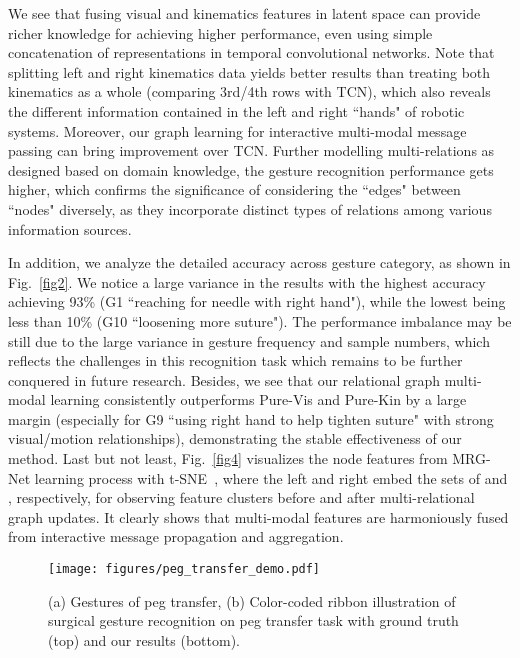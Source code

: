 \documentclass[letterpaper, 10 pt, conference]{ieeeconf}
\begin{document}
We see that fusing visual and kinematics features in latent space can provide richer knowledge for achieving higher performance, even using simple concatenation of representations in temporal convolutional networks.
Note that splitting left and right kinematics data yields better results than treating both kinematics as a whole (comparing 3rd/4th rows with TCN), which also reveals the different information contained in the left and right ``hands" of robotic systems.
Moreover, our graph learning for interactive multi-modal message passing can bring improvement over TCN.
Further modelling multi-relations as designed based on domain knowledge, the gesture recognition performance gets higher, which confirms the significance of considering the ``edges" between ``nodes" diversely, as they incorporate distinct types of relations among various information sources.

In addition, we analyze the detailed accuracy across gesture category, as shown in Fig.~\ref{fig2}.
We notice a large variance in the results with the highest accuracy achieving 93\% (G1 ``reaching for needle with right hand"), while the lowest being less than 10\% (G10 ``loosening more suture").
The performance imbalance may be still due to the large variance in gesture frequency and sample numbers, which reflects the challenges in this recognition task which remains to be further conquered in future research.
Besides, we see that our relational graph multi-modal learning consistently outperforms Pure-Vis and Pure-Kin by a large margin (especially for G9 ``using right hand to help tighten suture" with strong visual/motion relationships), demonstrating the stable effectiveness of our method.
Last but not least, Fig.~\ref{fig4} visualizes the node features from MRG-Net learning process with t-SNE~\cite{maaten2008visualizing}, where the left and right embed the sets of  and , respectively, for observing feature clusters before and after multi-relational graph updates.
It clearly shows that multi-modal features are harmoniously fused from interactive message propagation and aggregation.

\begin{figure}[t]
  \centering
  \texttt{[image: figures/peg\_transfer\_demo.pdf]}
  \vspace{-3mm}
  \caption{(a) Gestures of peg transfer, (b) Color-coded ribbon illustration of surgical gesture recognition on peg transfer task with ground truth (top) and our results (bottom).}
  \label{fig_peg}
  \vspace{-5mm}
\end{figure}
\end{document}
